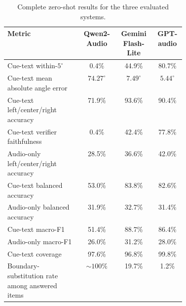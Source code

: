 \documentclass{article}
\begin{document}
\begin{table}[H]
\caption{Complete zero-shot results for the three evaluated systems.}
\label{tab:complete-results}
\centering
\setlength{\tabcolsep}{4pt}
\begin{tabular}{>{\raggedright\arraybackslash}p{0.42\linewidth}ccc}
\toprule
Metric & Qwen2-Audio & Gemini Flash-Lite & GPT-audio \\
\midrule
Cue-text within-\(5^\circ\) & 0.4\% & 44.9\% & 80.7\% \\
Cue-text mean absolute angle error & \(74.27^\circ\) & \(7.49^\circ\) & \(5.44^\circ\) \\
Cue-text left/center/right accuracy & 71.9\% & 93.6\% & 90.4\% \\
Cue-text verifier faithfulness & 0.4\% & 42.4\% & 77.8\% \\
Audio-only left/center/right accuracy & 28.5\% & 36.6\% & 42.0\% \\
Cue-text balanced accuracy & 53.0\% & 83.8\% & 82.6\% \\
Audio-only balanced accuracy & 31.9\% & 32.7\% & 31.4\% \\
Cue-text macro-F1 & 51.4\% & 88.7\% & 86.4\% \\
Audio-only macro-F1 & 26.0\% & 31.2\% & 28.0\% \\
Cue-text coverage & 97.6\% & 96.8\% & 99.8\% \\
Boundary-substitution rate among answered items & \(\sim100\%\) &
19.7\% & 1.2\% \\
\bottomrule
\end{tabular}
\end{table}
\end{document}
